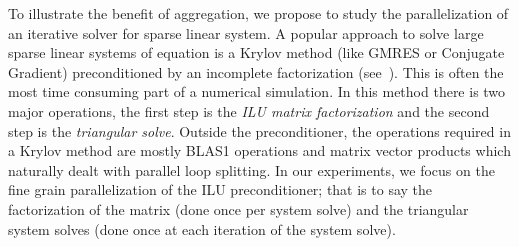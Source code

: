 

To illustrate the benefit of aggregation, we propose to study the parallelization of an iterative 
solver for sparse linear system. 
A popular approach to solve large sparse linear systems of equation is a Krylov
method (like GMRES or Conjugate Gradient) preconditioned by an incomplete
factorization (see~\cite{Saad96IMSLS}).
This is often the most time consuming part of a numerical simulation.
In this method there is two major operations, the first step is the {\em ILU matrix factorization}
and the second step is the {\em triangular solve}.
Outside the preconditioner, the operations required in a Krylov method are
mostly BLAS1 operations and matrix vector products which naturally dealt with
parallel loop splitting.
In our experiments, we focus on the fine grain parallelization of
the ILU preconditioner; that is to say the factorization of the matrix (done once per system solve) and
the triangular system solves (done once at each iteration of the system solve).


